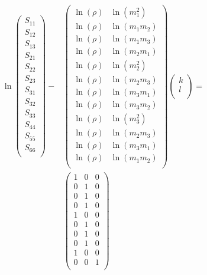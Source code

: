 \documentclass[a4paper,fleqn]{DC_ArtStyle}
\begin{document}
	\begin{equation}
	\begin{split}
	\ln
	\begin{pmatrix}
	S_{11} \\
	S_{12} \\
	S_{13} \\
	S_{21} \\
	S_{22} \\
	S_{23} \\
	S_{31} \\
	S_{32} \\
	S_{33} \\
	S_{44} \\
	S_{55} \\
	S_{66} \\
	\end{pmatrix} - & \begin{pmatrix}
	\ln(\rho) & \ln(m_1^2) \\
	\ln(\rho) & \ln(m_1 m_2) \\
	\ln(\rho) & \ln(m_1 m_3) \\
	\ln(\rho) & \ln(m_2 m_1) \\
	\ln(\rho) & \ln(m_2^2) \\
	\ln(\rho) & \ln(m_2 m_3) \\
	\ln(\rho) & \ln(m_3 m_1) \\
	\ln(\rho) & \ln(m_3 m_2) \\
	\ln(\rho) & \ln(m_3^2) \\
	\ln(\rho) & \ln(m_2 m_3) \\
	\ln(\rho) & \ln(m_3 m_1) \\
	\ln(\rho) & \ln(m_1 m_2) \\
	\end{pmatrix} \begin{pmatrix}
	k \\
	l \\
	\end{pmatrix} = \\ & \begin{pmatrix}
	1 & 0 & 0 \\
	0 & 1 & 0 \\
	0 & 1 & 0 \\
	0 & 1 & 0 \\
	1 & 0 & 0 \\
	0 & 1 & 0 \\
	0 & 1 & 0 \\
	0 & 1 & 0 \\
	1 & 0 & 0 \\
	0 & 0 & 1 \\

\end{pmatrix}
\end{split}
\end{equation}
\end{document}
